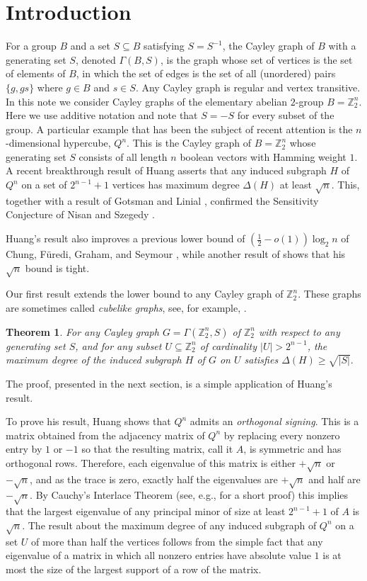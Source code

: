 \documentclass[11pt]{article}
\newtheorem{theo}{Theorem}[section]
\begin{document}
\section{Introduction} \label{sec: intro}
For a group $B$ and a set $S \subseteq B$ satisfying
$S=S^{-1}$, the Cayley graph of  
$B$ with a generating set $S$, denoted $\Gamma(B, S)$, is  
the graph whose set of vertices 
is the set of elements of $B$, in which the set of edges is the 
set of all (unordered) pairs $\{g, gs\}$ where $g \in B$ and $s \in S$.
Any Cayley graph is regular and vertex transitive. In this note we  
consider Cayley graphs of the elementary abelian $2$-group 
$B = \mathbb{Z}_{2}^{n}$. Here we use additive notation and note that
$S=-S$ for every subset of the group. A particular example that 
has been the subject of recent attention is the $n$-dimensional hypercube, 
$Q^{n}$. This is the Cayley graph of $B = \mathbb{Z}_{2}^{n}$ whose 
generating set $S$ consists of all length $n$ boolean vectors 
with Hamming weight $1$. A recent breakthrough 
result of Huang \cite{Hu} asserts that any 
induced subgraph $H$ of $Q^{n}$ on a set of $2^{n-1}+1$ vertices
has maximum degree $\Delta(H)$ at least $\sqrt{n}$.
This, together with a result of Gotsman and Linial \cite{GL}, 
confirmed the Sensitivity Conjecture of Nisan and Szegedy \cite{NS}.

Huang's result also improves a previous lower bound of
$(\frac{1}{2} - o(1))\log_2{n}$ of Chung, F{\"u}redi, Graham, and
Seymour \cite{CFGS}, while another result of \cite{CFGS} shows that
his $\sqrt n$ bound is tight.

Our first result extends the lower bound to any Cayley graph
of ${\mathbb{Z}_{2}^{n}}$. 
These graphs are sometimes called \emph{cubelike graphs}, see, for example,
\cite{MPRR}.
\begin{theo}
\label{t11}
For any Cayley graph $G=\Gamma(\mathbb{Z}_{2}^{n}, S)$
of $\mathbb{Z}_{2}^{n}$ with respect to any
generating set $S$, and for
any subset $U \subseteq \mathbb{Z}_{2}^{n}$
of cardinality $|U| > 2^{n-1}$, the maximum degree of the induced subgraph
$H$ of $G$ on $U$ satisfies $\Delta(H) \geq \sqrt{|S|}.$
\end{theo}
The proof, presented in the next section, is a simple application of
Huang's result. 

To prove his result, Huang shows that $Q^n$ admits
an {\em orthogonal signing}. This is a matrix obtained from the adjacency
matrix of $Q^n$ by replacing every nonzero entry by $1$ or $-1$ so that
the resulting matrix, call it $A$,
is symmetric and has orthogonal rows. Therefore, each
eigenvalue of this matrix is either $+\sqrt n$ or $-\sqrt n$, and as the
trace is zero, exactly half the eigenvalues are $+\sqrt n$ and half are
$-\sqrt n$. By Cauchy's Interlace Theorem (see, e.g., \cite{Hw} for 
a short proof) this implies that the largest eigenvalue of any principal
minor of size at least $2^{n-1}+1$ of $A$ is $\sqrt n$. The result
about the maximum degree of any induced subgraph of $Q^n$ on a set
$U$ of more than half the vertices follows from the simple fact that 
any eigenvalue of a matrix in which all nonzero entries have absolute
value $1$ is at most the size of the largest support of a row  of the
matrix. 
\end{document}
